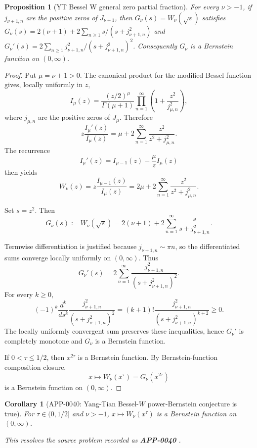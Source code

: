 \documentclass[11pt]{article}
\numberwithin{equation}{section}
\newtheorem{proposition}[theorem]{Proposition}
\newtheorem{corollary}[theorem]{Corollary}
\theoremstyle{definition}
\theoremstyle{remark}
\newcommand{\1}{\mathbf 1}
\begin{document}
\begin{proposition}[YT Bessel W general zero partial fraction]
\label{res:yt-bessel-w-general-zero-partial-fraction}
For every \(\nu>-1\), if \(j_{\nu+1,n}\) are the positive zeros of \(J_{\nu+1}\), then \(G_\nu(s)=W_\nu(\sqrt{s})\) satisfies \(G_\nu(s)=2(\nu+1)+2\sum_{n\ge1}s/(s+j_{\nu+1,n}^2)\) and \(G_\nu'(s)=2\sum_{n\ge1}j_{\nu+1,n}^2/(s+j_{\nu+1,n}^2)^2\). Consequently \(G_\nu\) is a Bernstein function on \((0,\infty)\).
\end{proposition}

\begin{proof}
Put \(\mu=\nu+1>0\). The canonical product for the modified Bessel function gives, locally uniformly in \(z\),
\[
I_\mu(z)=\frac{(z/2)^\mu}{\Gamma(\mu+1)}
\prod_{n=1}^{\infty}\left(1+\frac{z^2}{j_{\mu,n}^2}\right),
\]
where \(j_{\mu,n}\) are the positive zeros of \(J_\mu\). Therefore
\[
z\frac{I_\mu'(z)}{I_\mu(z)}
=\mu+2\sum_{n=1}^{\infty}\frac{z^2}{z^2+j_{\mu,n}^2}.
\]
The recurrence
\[
I_\mu'(z)=I_{\mu-1}(z)-\frac{\mu}{z}I_\mu(z)
\]
then yields
\[
W_\nu(z)
=z\frac{I_{\mu-1}(z)}{I_\mu(z)}
=2\mu+2\sum_{n=1}^{\infty}\frac{z^2}{z^2+j_{\mu,n}^2}.
\]

Set \(s=z^2\). Then
\[
G_\nu(s):=W_\nu(\sqrt s)
=2(\nu+1)+2\sum_{n=1}^{\infty}\frac{s}{s+j_{\nu+1,n}^2}.
\]

Termwise differentiation is justified because \(j_{\nu+1,n}\sim \pi n\), so the differentiated sums converge locally uniformly on \((0,\infty)\). Thus
\[
G_\nu'(s)
=2\sum_{n=1}^{\infty}
\frac{j_{\nu+1,n}^2}{(s+j_{\nu+1,n}^2)^2}.
\]
For every \(k\ge0\),
\[
(-1)^k\frac{d^k}{ds^k}
\frac{j_{\nu+1,n}^2}{(s+j_{\nu+1,n}^2)^2}
=
(k+1)!\frac{j_{\nu+1,n}^2}{(s+j_{\nu+1,n}^2)^{k+2}}
\ge0.
\]
The locally uniformly convergent sum preserves these inequalities, hence \(G_\nu'\) is completely monotone and \(G_\nu\) is a Bernstein function.

If \(0<\tau\le1/2\), then \(x^{2\tau}\) is a Bernstein function. By Bernstein-function composition closure,
\[
x\mapsto W_\nu(x^\tau)=G_\nu(x^{2\tau})
\]
is a Bernstein function on \((0,\infty)\).
\end{proof}

\begin{corollary}[APP-0040: Yang-Tian Bessel-\(W\) power-Bernstein conjecture is true]
\label{res:yt-bessel-w-power-bernstein-conjecture}
For \(\tau\in(0,1/2]\) and \(\nu>-1\), \(x\mapsto W_\nu(x^\tau)\) is a Bernstein function on \((0,\infty)\).



This resolves the source problem recorded as \textbf{APP-0040} \cite{app-app-0040-source}.
\end{corollary}
\end{document}
